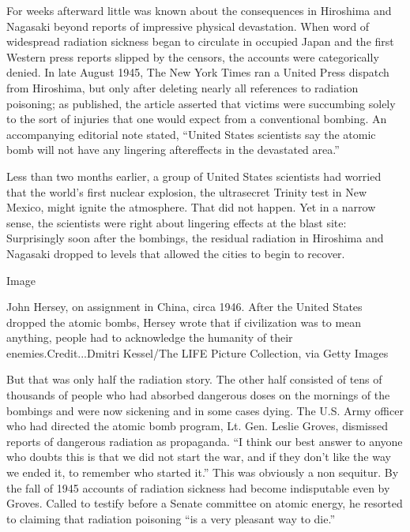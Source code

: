 For weeks afterward little was known about the consequences in Hiroshima
and Nagasaki beyond reports of impressive physical devastation. When
word of widespread radiation sickness began to circulate in occupied
Japan and the first Western press reports slipped by the censors, the
accounts were categorically denied. In late August 1945, The New York
Times ran a United Press dispatch from Hiroshima, but only after
deleting nearly all references to radiation poisoning; as published, the
article asserted that victims were succumbing solely to the sort of
injuries that one would expect from a conventional bombing. An
accompanying editorial note stated, ``United States scientists say the
atomic bomb will not have any lingering aftereffects in the devastated
area.''

Less than two months earlier, a group of United States scientists had
worried that the world's first nuclear explosion, the ultrasecret
Trinity test in New Mexico, might ignite the atmosphere. That did not
happen. Yet in a narrow sense, the scientists were right about lingering
effects at the blast site: Surprisingly soon after the bombings, the
residual radiation in Hiroshima and Nagasaki dropped to levels that
allowed the cities to begin to recover.

Image

John Hersey, on assignment in China, circa 1946. After the United States
dropped the atomic bombs, Hersey wrote that if civilization was to mean
anything, people had to acknowledge the humanity of their
enemies.Credit...Dmitri Kessel/The LIFE Picture Collection, via Getty
Images

But that was only half the radiation story. The other half consisted of
tens of thousands of people who had absorbed dangerous doses on the
mornings of the bombings and were now sickening and in some cases dying.
The U.S. Army officer who had directed the atomic bomb program, Lt. Gen.
Leslie Groves, dismissed reports of dangerous radiation as propaganda.
``I think our best answer to anyone who doubts this is that we did not
start the war, and if they don't like the way we ended it, to remember
who started it.'' This was obviously a non sequitur. By the fall of 1945
accounts of radiation sickness had become indisputable even by Groves.
Called to testify before a Senate committee on atomic energy, he
resorted to claiming that radiation poisoning ``is a very pleasant way
to die.''

